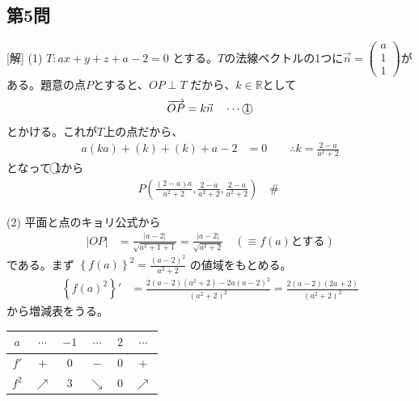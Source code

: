 \documentclass[../main.tex]{subfiles}
\begin{document}
\begin{center}
\end{center}

\subsection*{第5問}
[解] (1) $T: ax+y+z+a-2=0$ とする。$T$の法線ベクトルの1つに$\vec{n} =
\begin{pmatrix} a \\ 1 \\ 1
\end{pmatrix}$がある。題意の点$P$とすると、$OP \perp T$ だから、$k \in \mathbb{R}$として
\begin{equation*}
  \overrightarrow{OP} = k\vec{n} \quad \cdots \text{\textcircled{1}}
\end{equation*}
とかける。これが$T$上の点だから、
\begin{align*}
  a(ka) + (k) + (k) + a-2 &= 0 \qquad \therefore k = \frac{2-a}{a^2+2}
\end{align*}
となって \textcircled{1}から
\begin{align*}
  P\left( \frac{(2-a)a}{a^2+2}, \frac{2-a}{a^2+2}, \frac{2-a}{a^2+2} \right) \quad \text{\#\ \ }
\end{align*}

(2) 平面と点のキョリ公式から
\begin{align*}
  |OP| &= \frac{|a-2|}{\sqrt{a^2+1+1}} = \frac{|a-2|}{\sqrt{a^2+2}} \quad (\equiv f(a) \text{とする})
\end{align*}
である。まず $\left\{ f(a) \right\}^2 = \frac{(a-2)^2}{a^2+2}$ の値域をもとめる。
\begin{align*}
  \left\{ f(a)^2 \right\}' &= \frac{2(a-2)(a^2+2) - 2a(a-2)^2}{(a^2+2)^2} = \frac{2(a-2)(2a+2)}{(a^2+2)^2}
\end{align*}
から増減表をうる。

\begin{center}
  \begin{tabular}{|c|c|c|c|c|c|}
    \hline
    $a$ & $\cdots$ & $-1$ & $\cdots$ & $2$ & $\cdots$ \\ \hline
    $f'$ & $+$ & $0$ & $-$ & $0$ & $+$ \\ \hline
    $f^2$ & $\nearrow$ & $3$ & $\searrow$ & $0$ & $\nearrow$ \\ \hline
  \end{tabular}
\end{center}
\end{document}
